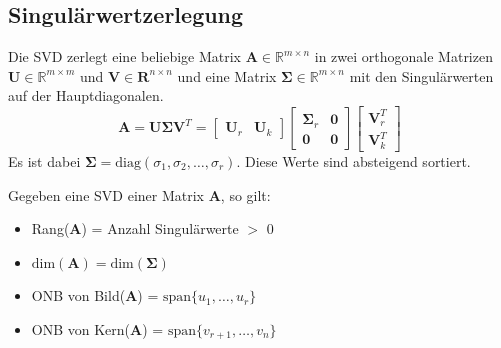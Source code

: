 \documentclass[11pt]{article}
\begin{document}
\subsection*{Singulärwertzerlegung}
\vspace*{-0.5cm}
Die SVD zerlegt eine beliebige Matrix $\mathbf{A} \in \mathbb{R}^{m\times n}$ in zwei orthogonale Matrizen $\mathbf{U} \in \mathbb{R}^{m\times m}$ und $\mathbf{V} \in \mathbf{R}^{n\times n}$ und eine Matrix $\mathbf{\Sigma} \in \mathbb{R}^{m \times n}$ mit den Singulärwerten auf der Hauptdiagonalen.
$$\mathbf{A} = \mathbf{U\Sigma V}^T = \begin{bmatrix}
    \mathbf{U}_r & \mathbf{U}_k
\end{bmatrix} \begin{bmatrix}
    \mathbf{\Sigma}_r & \mathbf{0} \\
    \mathbf{0} & \mathbf{0}
\end{bmatrix} \begin{bmatrix}
    \mathbf{V}_r^T \\
    \mathbf{V}_k^T
\end{bmatrix}$$
Es ist dabei $\mathbf{\Sigma} = \text{diag}(\sigma_1, \sigma_2, \dots,\sigma_r )$. Diese Werte sind absteigend sortiert.

Gegeben eine SVD einer Matrix $\mathbf{A}$, so gilt:
\vspace*{-0.5cm}
\begin{itemize}
    \item Rang($\mathbf{A}$) = Anzahl Singulärwerte $>$ 0
    \item $\text{dim}(\mathbf{A}) = \text{dim}(\mathbf{\Sigma})$
    \item ONB von Bild($\mathbf{A}$) = $\text{span}\{u_1, \dots, u_r\}$
    \item ONB von Kern($\mathbf{A}$) = $\text{span}\{v_{r+1}, \dots, v_n\}$
\end{itemize}
\end{document}
